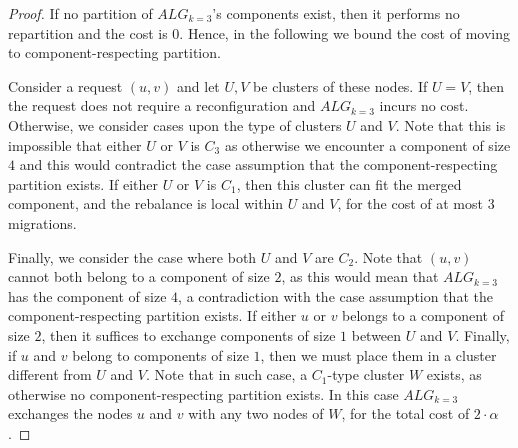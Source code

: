 \documentclass[manuscript,screen=true]{acmart}
\newcommand{\TAlg}{{\ensuremath{ALG_{k=3}}}\xspace} %
\begin{document}
\begin{proof}
  If no partition of \TAlg's components exist, then it performs no repartition and the cost is $0$.
  Hence, in the following we bound the cost of moving to component-respecting partition.

  
    Consider a request $(u, v)$ and let $U, V$ be clusters of these nodes.
    If $U=V$, then the request does not require a reconfiguration and \TAlg{} incurs no cost.
    Otherwise, we consider cases upon the type of clusters $U$ and $V$.
    Note that this is impossible that either $U$ or $V$ is $C_3$ as otherwise we encounter a component of size $4$ and this would contradict the case assumption that the component-respecting partition exists.
    If either $U$ or $V$ is $C_1$, then this cluster can fit the merged component, and the rebalance is local within $U$ and $V$, for the cost of at most $3$ migrations.
  
    Finally, we consider the case where both $U$ and $V$ are $C_2$. Note that $(u,v)$ cannot both belong to a component of size $2$, as this would mean that \TAlg{} has the component of size $4$, a contradiction with the case assumption that the component-respecting partition exists. 
    If either $u$ or $v$ belongs to a component of size $2$, then it suffices to exchange components of size $1$ between $U$ and $V$.
    Finally, if $u$ and $v$ belong to components of size $1$, then we must place them in a cluster different from $U$ and $V$.
    Note that in such case, a $C_1$-type cluster $W$ exists, as otherwise no component-respecting partition exists. In this case \TAlg{} exchanges the nodes $u$ and $v$ with any two nodes of $W$, for the total cost of $2\cdot \alpha$.
\end{proof}
\end{document}
